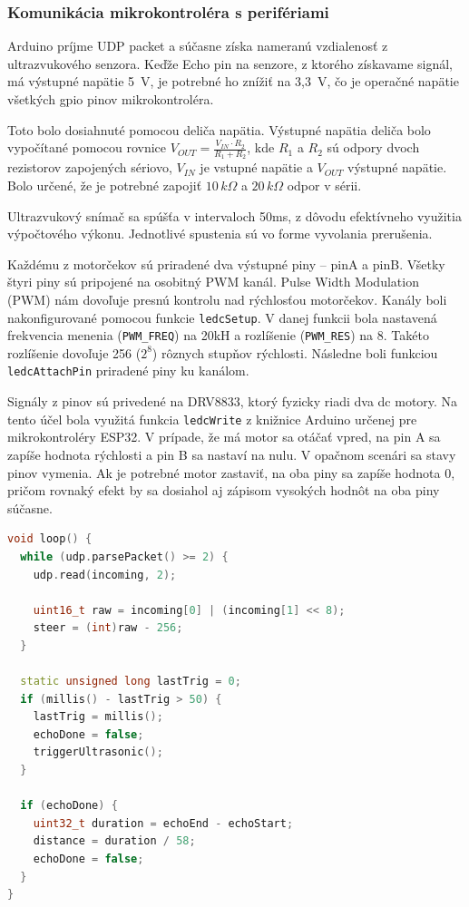 \subsubsection{Komunikácia mikrokontroléra s perifériami}
Arduino príjme UDP packet a súčasne získa nameranú vzdialenosť z ultrazvukového senzora. Keďže Echo pin na senzore, z ktorého získavame signál, má výstupné napätie 5~V, je potrebné ho znížiť na 3,3~V, čo je operačné napätie všetkých \acrshort{gpio} pinov mikrokontroléra.\par
Toto bolo dosiahnuté pomocou deliča napätia. Výstupné napätia deliča bolo vypočítané pomocou rovnice $V_{OUT} = \frac{V_{IN} \cdot R_2}{R_1 + R_2}$, kde $R_1$ a $R_2$ sú odpory dvoch rezistorov zapojených sériovo, $V_{IN}$ je vstupné napätie a $V_{OUT}$ výstupné napätie. Bolo určené, že je potrebné zapojiť $10 \,k\Omega$ a $20 \,k\Omega$ odpor v sérii.\par
Ultrazvukový snímač sa spúšťa v intervaloch 50ms, z dôvodu efektívneho využitia výpočtového výkonu. Jednotlivé spustenia sú vo forme vyvolania prerušenia.\par
Každému z motorčekov sú priradené dva výstupné piny -- pinA a pinB. Všetky štyri piny sú pripojené na osobitný PWM kanál. Pulse Width Modulation (PWM) nám dovoľuje presnú kontrolu nad rýchlosťou motorčekov. Kanály boli nakonfigurované pomocou funkcie \verb|ledcSetup|. V danej funkcii bola nastavená frekvencia menenia (\verb|PWM_FREQ|) na 20kH a rozlíšenie (\verb|PWM_RES|) na 8. Takéto rozlíšenie dovoľuje 256 ($2^8$) rôznych stupňov rýchlosti. Následne boli funkciou \verb|ledcAttachPin| priradené piny ku kanálom.\par
Signály z pinov sú privedené na DRV8833, ktorý fyzicky riadi dva \acrshort{dc} motory. Na tento účel bola využitá funkcia \verb|ledcWrite| z knižnice Arduino určenej pre mikrokontroléry ESP32. V prípade, že má motor sa otáčať vpred, na pin A sa zapíše hodnota rýchlosti a pin B sa nastaví na nulu. V opačnom scenári sa stavy pinov vymenia. Ak je potrebné motor zastaviť, na oba piny sa zapíše hodnota 0, pričom rovnaký efekt by sa dosiahol aj zápisom vysokých hodnôt na oba piny súčasne.\par
\begin{lstlisting}[language=C++, caption=Vnútorný cyklus Arduina]
void loop() {
  while (udp.parsePacket() >= 2) {
    udp.read(incoming, 2);

    uint16_t raw = incoming[0] | (incoming[1] << 8);
    steer = (int)raw - 256;
  }

  static unsigned long lastTrig = 0;
  if (millis() - lastTrig > 50) {
    lastTrig = millis();
    echoDone = false;
    triggerUltrasonic();
  }

  if (echoDone) {
    uint32_t duration = echoEnd - echoStart;
    distance = duration / 58;
    echoDone = false;
  }
}
\end{lstlisting}
